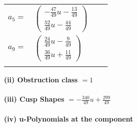\documentclass[1p]{elsarticle_modified}
\theoremstyle{definition}
\begin{document}
\begin{tabular}{m{7pt} m{180pt} m{7pt} m{180pt} }
\flushright $a_{5}=$&$\begin{pmatrix}-\frac{47}{49} u-\frac{13}{49}\\\frac{52}{49} u-\frac{44}{49}\end{pmatrix}$ \\
\flushright $a_{9}=$&$\begin{pmatrix}\frac{24}{49} u-\frac{9}{49}\\\frac{36}{49} u+\frac{11}{49}\end{pmatrix}$\\&\end{tabular}
\flushleft \textbf{(ii) Obstruction class $= 1$}\\~\\
\flushleft \textbf{(iii) Cusp Shapes $= -\frac{340}{49} u+\frac{299}{49}$}\\~\\
\newpage\renewcommand{\arraystretch}{1}
\flushleft \textbf{(iv) u-Polynomials at the component}\newline \\
\end{document}
